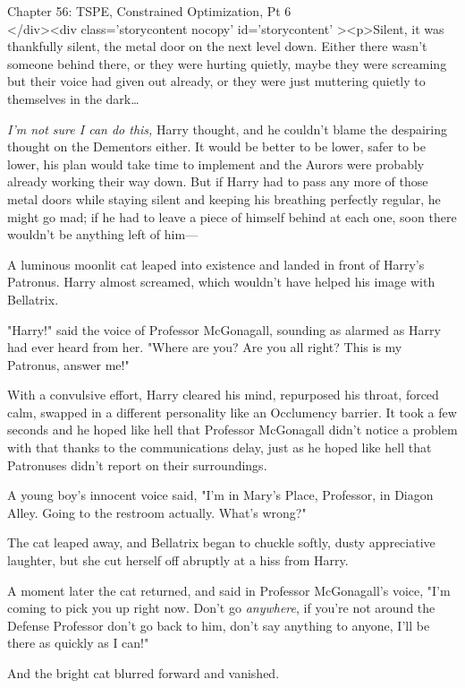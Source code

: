 
Chapter 56: TSPE, Constrained Optimization, Pt 6\\
</div><div  class='storycontent nocopy' id='storycontent' ><p>Silent, it was 
thankfully silent, the metal door on the next level down. Either there wasn't 
someone behind there, or they were hurting quietly, maybe they were screaming 
but their voice had given out already, or they were just muttering quietly to 
themselves in the dark{\ldots}

\emph{I'm not sure I can do this,} Harry thought, and he couldn't blame the 
despairing thought on the Dementors either. It would be better to be lower, 
safer to be lower, his plan would take time to implement and the Aurors were 
probably already working their way down. But if Harry had to pass any more of 
those metal doors while staying silent and keeping his breathing perfectly 
regular, he might go mad; if he had to leave a piece of himself behind at each 
one, soon there wouldn't be anything left of him---

A luminous moonlit cat leaped into existence and landed in front of Harry's 
Patronus. Harry almost screamed, which wouldn't have helped his image with 
Bellatrix.

"Harry!" said the voice of Professor McGonagall, sounding as alarmed as Harry 
had ever heard from her. "Where are you? Are you all right? This is my 
Patronus, answer me!"

With a convulsive effort, Harry cleared his mind, repurposed his throat, forced 
calm, swapped in a different personality like an Occlumency barrier. It took a 
few seconds and he hoped like hell that Professor McGonagall didn't notice a 
problem with that thanks to the communications delay, just as he hoped like 
hell that Patronuses didn't report on their surroundings.

A young boy's innocent voice said, "I'm in Mary's Place, Professor, in Diagon 
Alley. Going to the restroom actually. What's wrong?"

The cat leaped away, and Bellatrix began to chuckle softly, dusty appreciative 
laughter, but she cut herself off abruptly at a hiss from Harry.

A moment later the cat returned, and said in Professor McGonagall's voice, "I'm 
coming to pick you up right now. Don't go \emph{anywhere}, if you're not around 
the Defense Professor don't go back to him, don't say anything to anyone, I'll 
be there as quickly as I can!"

And the bright cat blurred forward and vanished.

